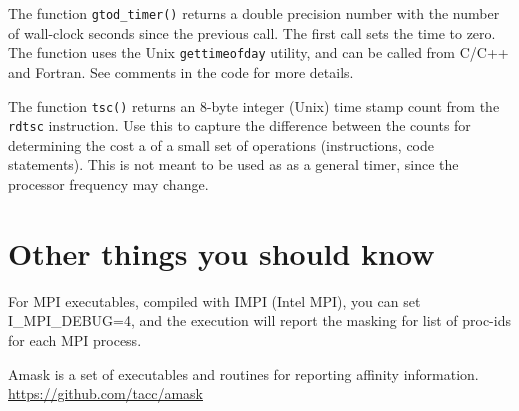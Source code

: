 \documentclass[10pt,a4paper]{report}
\begin{document}
The function \verb+gtod_timer()+ returns a double precision number with the number
of wall-clock seconds since the previous call.  The first call sets the time
to zero. The function uses the Unix \verb+gettimeofday+ utility, and  can be called from 
C/C++ and Fortran.  See comments in the code for
more details.

The function \verb+tsc()+ returns an 8-byte integer (Unix) time stamp count from
the \verb+rdtsc+ instruction. Use this to capture the difference between the counts for
determining 
the cost a of a small set of operations (instructions, code statements). This is
not meant to be used as as a general timer, since the processor frequency may change.



\section{Other things you should know}
For MPI executables, compiled with IMPI (Intel MPI), 
you can set I\_MPI\_DEBUG=4, and the execution will
report the masking for list of proc-ids for each MPI process. 


\FloatBarrier
{}
\begin{thebibliography}{00}


 Amask is a set of executables and routines for reporting affinity information. \href{https://github.com/tacc/amask}{https://github.com/tacc/amask}


\end{thebibliography}
\end{document}

